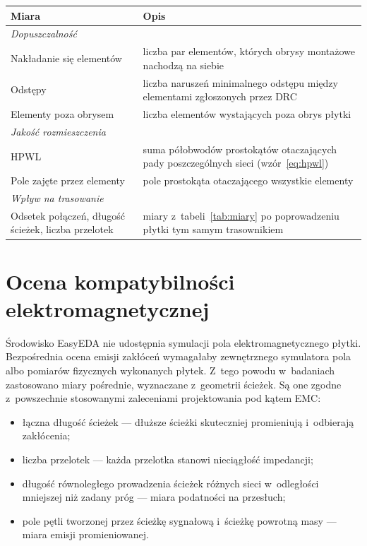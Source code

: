 \begin{table}[ht]
\label{tab:miary-rl}
\centering\footnotesize%
\begin{tabular}{p{} p{}}
\toprule
Miara & Opis \\
\midrule
\multicolumn{2}{l}{\emph{Dopuszczalność}} \\
\midrule
Nakładanie się elementów & liczba par elementów, których obrysy
  montażowe nachodzą na siebie \\
\midrule
Odstępy & liczba naruszeń minimalnego odstępu między elementami
  zgłoszonych przez DRC \\
\midrule
Elementy poza obrysem & liczba elementów wystających poza obrys płytki \\
\midrule
\multicolumn{2}{l}{\emph{Jakość rozmieszczenia}} \\
\midrule
HPWL & suma półobwodów prostokątów otaczających pady poszczególnych
  sieci (wzór~\ref{eq:hpwl}) \\
\midrule
Pole zajęte przez elementy & pole prostokąta otaczającego wszystkie
  elementy \\
\midrule
\multicolumn{2}{l}{\emph{Wpływ na trasowanie}} \\
\midrule
Odsetek połączeń, długość ścieżek, liczba przelotek & miary z~tabeli~\ref{tab:miary}
  po poprowadzeniu płytki tym samym trasownikiem \\
\bottomrule
\end{tabular}
\end{table}

\section{Ocena kompatybilności elektromagnetycznej}
\label{sec:emc}

Środowisko EasyEDA nie udostępnia symulacji pola elektromagnetycznego płytki.
Bezpośrednia ocena emisji zakłóceń wymagałaby zewnętrznego symulatora pola
albo pomiarów fizycznych wykonanych płytek. Z~tego powodu w~badaniach
zastosowano miary pośrednie, wyznaczane z~geometrii ścieżek. Są one zgodne
z~powszechnie stosowanymi zaleceniami projektowania pod kątem EMC:
\begin{itemize}
  \item łączna długość ścieżek --- dłuższe ścieżki skuteczniej promieniują
    i~odbierają zakłócenia;
  \item liczba przelotek --- każda przelotka stanowi nieciągłość impedancji;
  \item długość równoległego prowadzenia ścieżek różnych sieci w~odległości
    mniejszej niż zadany próg --- miara podatności na przesłuch;
  \item pole pętli tworzonej przez ścieżkę sygnałową i~ścieżkę powrotną
    masy --- miara emisji promieniowanej.
\end{itemize}

